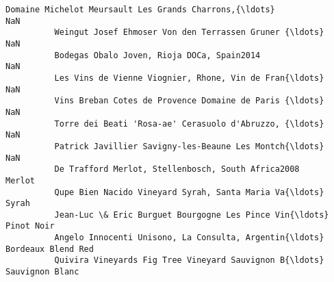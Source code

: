 \documentclass[11pt]{article}
\begin{document}
\begin{Verbatim}[commandchars=\\\{\}]
          Domaine Michelot Meursault Les Grands Charrons,{\ldots}                                  NaN   
          Weingut Josef Ehmoser Von den Terrassen Gruner {\ldots}                                  NaN   
          Bodegas Obalo Joven, Rioja DOCa, Spain2014                                          NaN   
          Les Vins de Vienne Viognier, Rhone, Vin de Fran{\ldots}                                  NaN   
          Vins Breban Cotes de Provence Domaine de Paris {\ldots}                                  NaN   
          Torre dei Beati 'Rosa-ae' Cerasuolo d'Abruzzo, {\ldots}                                  NaN   
          Patrick Javillier Savigny-les-Beaune Les Montch{\ldots}                                  NaN   
          De Trafford Merlot, Stellenbosch, South Africa2008                               Merlot   
          Qupe Bien Nacido Vineyard Syrah, Santa Maria Va{\ldots}                                Syrah   
          Jean-Luc \& Eric Burguet Bourgogne Les Pince Vin{\ldots}                           Pinot Noir   
          Angelo Innocenti Unisono, La Consulta, Argentin{\ldots}                   Bordeaux Blend Red   
          Quivira Vineyards Fig Tree Vineyard Sauvignon B{\ldots}                      Sauvignon Blanc   
          

\end{Verbatim}
\end{document}
